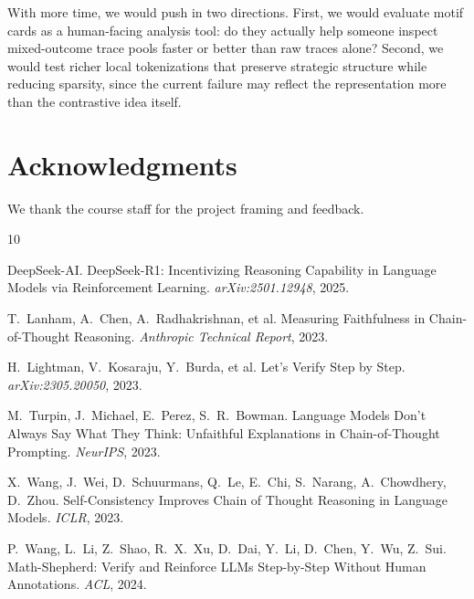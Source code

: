 \documentclass[11pt]{article}
\begin{document}
With more time, we would push in two directions. First, we would evaluate motif cards as a human-facing analysis tool: do they actually help someone inspect mixed-outcome trace pools faster or better than raw traces alone? Second, we would test richer local tokenizations that preserve strategic structure while reducing sparsity, since the current failure may reflect the representation more than the contrastive idea itself.

\section*{Acknowledgments}

We thank the course staff for the project framing and feedback.

\begin{thebibliography}{10}

DeepSeek-AI.
\newblock DeepSeek-R1: Incentivizing Reasoning Capability in Language Models via Reinforcement Learning.
\newblock \emph{arXiv:2501.12948}, 2025.

T.~Lanham, A.~Chen, A.~Radhakrishnan, et al.
\newblock Measuring Faithfulness in Chain-of-Thought Reasoning.
\newblock \emph{Anthropic Technical Report}, 2023.

H.~Lightman, V.~Kosaraju, Y.~Burda, et al.
\newblock Let's Verify Step by Step.
\newblock \emph{arXiv:2305.20050}, 2023.

M.~Turpin, J.~Michael, E.~Perez, S.~R.~Bowman.
\newblock Language Models Don't Always Say What They Think: Unfaithful Explanations in Chain-of-Thought Prompting.
\newblock \emph{NeurIPS}, 2023.

X.~Wang, J.~Wei, D.~Schuurmans, Q.~Le, E.~Chi, S.~Narang, A.~Chowdhery, D.~Zhou.
\newblock Self-Consistency Improves Chain of Thought Reasoning in Language Models.
\newblock \emph{ICLR}, 2023.

P.~Wang, L.~Li, Z.~Shao, R.~X.~Xu, D.~Dai, Y.~Li, D.~Chen, Y.~Wu, Z.~Sui.
\newblock Math-Shepherd: Verify and Reinforce LLMs Step-by-Step Without Human Annotations.
\newblock \emph{ACL}, 2024.

\end{thebibliography}
\end{document}
